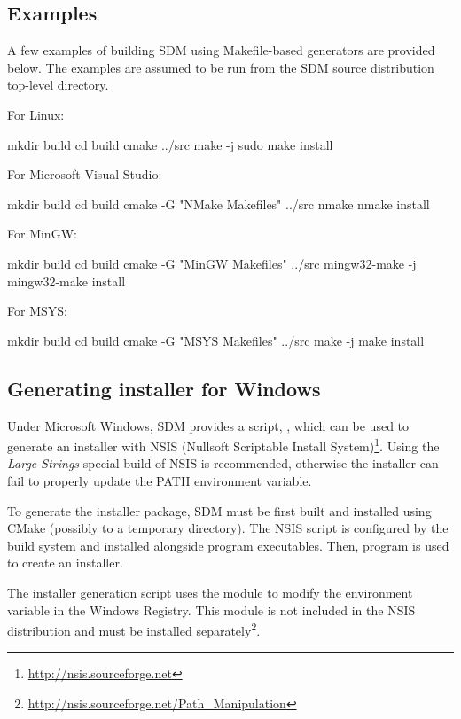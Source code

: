 \documentclass[a4paper,12pt,twoside,extrafontsizes]{memoir}
\begin{document}
\subsection{Examples}

A few examples of building SDM using Makefile-based generators are provided below. The examples are assumed to be run from the SDM source distribution top-level directory.

For Linux:

\begin{shellcmds}
mkdir build
cd build
cmake ../src
make -j
sudo make install
\end{shellcmds}

For Microsoft Visual Studio:

\begin{shellcmds}
mkdir build
cd build
cmake -G "NMake Makefiles" ../src
nmake
nmake install
\end{shellcmds}

For MinGW:

\begin{shellcmds}
mkdir build
cd build
cmake -G "MinGW Makefiles" ../src
mingw32-make -j
mingw32-make install
\end{shellcmds}

For MSYS:

\begin{shellcmds}
mkdir build
cd build
cmake -G "MSYS Makefiles" ../src
make -j
make install
\end{shellcmds}

\subsection{Generating installer for Windows}
\label{subsec:wininstaller}

Under Microsoft Windows, SDM provides a script, , which can be used to generate an installer with NSIS (Nullsoft Scriptable Install System)\footnote{\url{http://nsis.sourceforge.net}}. Using the \emph{Large Strings} special build of NSIS is recommended, otherwise the installer can fail to properly update the PATH environment variable.

To generate the installer package, SDM must be first built and installed using CMake (possibly to a temporary directory). The NSIS script is configured by the build system and installed alongside program executables. Then,  program is used to create an installer.

The installer generation script uses the  module to modify the  environment variable in the Windows Registry. This module is not included in the NSIS distribution and must be installed separately\footnote{\url{http://nsis.sourceforge.net/Path_Manipulation}}.
\end{document}
